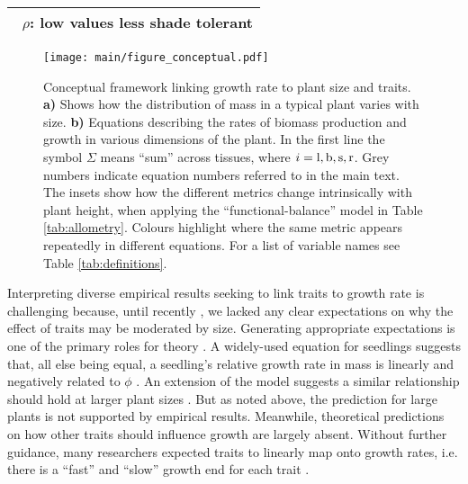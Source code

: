 \documentclass[9pt,twocolumn,twoside]{pnas-new}
\begin{document}
\begin{table}[!ht]
\begin{tabular}{p{8cm}}
 $\,$ $\rho$: low values less shade tolerant \citep{Osunkoya-1996}\\
  \bottomrule
\end{tabular}
\label{tab:phenomena}
\end{table}


\begin{figure}[!hb]
\centering
\texttt{[image: main/figure\_conceptual.pdf]}
\caption{Conceptual framework linking growth rate to plant size and traits.
\textbf{a)} Shows how the distribution of mass in a typical plant varies with size.
\textbf{b)} Equations describing the rates of biomass production and growth in various dimensions of the plant. In the first line the symbol $\Sigma$ means ``sum'' across tissues, where $i = {\rm l,b,s,r}$. Grey numbers indicate equation numbers referred to in the main text. The insets show how the different metrics change intrinsically with plant height, when applying the ``functional-balance'' model in Table \ref{tab:allometry}. Colours highlight where the same metric appears repeatedly in different equations. For a list of variable names see Table \ref{tab:definitions}.}
\label{fig:conceptual}
\end{figure}

Interpreting diverse empirical results seeking to link traits to growth rate is challenging because, until recently \citep{Gibert-2016}, we lacked any clear expectations on why the effect of traits may be moderated by size. Generating appropriate expectations is one of the primary roles for theory \citep{Kokko-2007}. A widely-used equation for seedlings suggests that, all else being equal, a seedling's relative growth rate in mass is linearly and negatively related to $\phi$ \citep{Lambers-1992, Cornelissen-1996, Wright-2000}. An extension of the model suggests a similar relationship should hold at larger plant sizes \citep{Enquist-2007}. But as noted above, the prediction for large plants is not supported by empirical results. Meanwhile, theoretical predictions on how other traits should influence growth are largely absent. Without further guidance, many researchers expected traits to linearly map onto growth rates, i.e. there is a ``fast'' and ``slow'' growth end for each trait \citep[e.g.][]{Grime-1977, Poorter-2008, Chave-2009, Paine-2015}.
\end{document}
